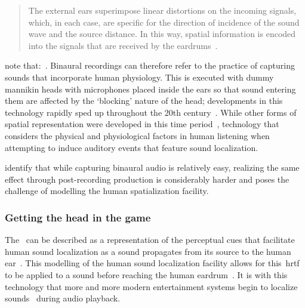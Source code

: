 \begin{quotation}
    The external ears superimpose linear distortions on the incoming signals, which, in each case, are specific for the direction of incidence of the sound wave and the source distance.
    In this way, spatial information is encoded into the signals that are received by the eardrums~\citep{blauert_spatial}.
\end{quotation}

\citet{roginska2017immersive} note that:~.
Binaural recordings can therefore refer to the practice of capturing sounds that incorporate human physiology.
This is executed with dummy mannikin heads with microphones placed inside the ears so that sound entering them are affected by the `blocking' nature of the head;
developments in this technology rapidly sped up throughout the 20th century~\citep{binaural_paul}.
While other forms of spatial representation were developed in this time period~\citep{gerzon_periphony, noisternig_ambisonic, wave_field}, technology that considers the physical and physiological factors in human listening when attempting to induce auditory events that feature sound localization.

\citet{roginska2017immersive} identify that while capturing binaural audio is relatively easy, realizing the same effect through post-recording production is considerably harder and poses the challenge of modelling the human spatialization facility.

\subsubsection{Getting the head in the game}

The~ can be described as a representation of the perceptual cues that facilitate human sound localization as a sound propagates from its source to the human ear~\citep{Suzuki2011}.
This modelling of the human sound localization facility allows for this~\gls{hrtf} to be applied to a sound before reaching the human eardrum~\citep{roginska2017immersive}.
It is with this technology that more and more modern entertainment systems begin to localize sounds~\citep{blauert_spatial, HONDA2007, roginska2017immersive, Suzuki2011, Xie2013, ps5_audio, soundscape_design} during audio playback.


